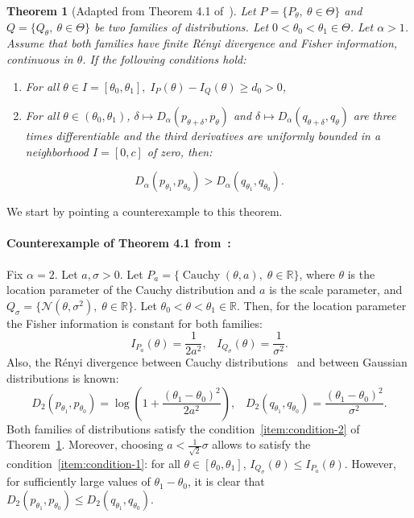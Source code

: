 \documentclass{article}
\theoremstyle{plain}
\newtheorem{theorem}{Theorem}[section]
\theoremstyle{definition}
\theoremstyle{remark}
\DeclareMathOperator{\Cauchy}{Cauchy}
\begin{document}
\begin{theorem}[Adapted from Theorem 4.1 of~\citet{Abbasnejad2006}]
\label{thm:renyi-fisher-comparison-wrong}
Let $P = \{P_\theta,\ \theta\in \Theta\}$ and $Q = \{Q_\theta,\ \theta\in \Theta\}$ be two families of distributions. Let $0 < \theta_0 < \theta_1 \in \Theta$. Let $\alpha > 1$. Assume that both families have finite Rényi divergence and Fisher information, continuous in $\theta$. If the following conditions hold:
\begin{enumerate}
    \item \label{item:condition-1} For all $\theta \in I=[\theta_0,\theta_1], \;I_P(\theta) - I_Q(\theta) \geq d_0 > 0$,
    \item \label{item:condition-2} For all $\theta \in (\theta_0,\theta_1)$, $\delta \mapsto D_\alpha(p_{\theta + \delta},p_\theta)$ and $\delta \mapsto D_\alpha(q_{\theta + \delta},q_\theta)$ are three times differentiable and the third derivatives are uniformly bounded in a neighborhood $I = [0,c]$ of zero, then:
\end{enumerate}
\[ D_\alpha(p_{\theta_1},p_{\theta_0}) >D_\alpha(q_{\theta_1},q_{\theta_0}).\]
\end{theorem}
We start by pointing a counterexample to this theorem.

\paragraph{Counterexample of Theorem 4.1 from~\citet{Abbasnejad2006}:}
Fix $\alpha = 2$. Let $a, \sigma > 0$. Let $P_a = \{ \Cauchy(\theta, a),\; \theta \in \mathbb{R}\}$, where $\theta$ is the location parameter of the Cauchy distribution and $a$ is the scale parameter, and $Q_\sigma = \{ \mathcal{N}(\theta, \sigma^2),\; \theta \in \mathbb{R}\}$. Let $\theta_0 < \theta < \theta_1 \in \mathbb{R}$. Then, for the location parameter the Fisher information is constant for both families:
\[I_{P_a}(\theta) = \frac{1}{2 a^2},\;\;\; I_{Q_\sigma}(\theta) = \frac{1}{\sigma^2}.\]
 Also, the Rényi divergence between Cauchy distributions~\citep{Verdu2023} and between Gaussian distributions is known:
 \[D_2(p_{\theta_1}, p_{\theta_0}) = \log\left(1 + \frac{(\theta_1-\theta_0)^2}{2 a^2}\right),\;\;\; D_2(q_{\theta_1}, q_{\theta_0}) = \frac{(\theta_1-\theta_0)^2}{\sigma^2}.\]
 Both families of distributions satisfy the condition~\ref{item:condition-2} of Theorem~\ref{thm:renyi-fisher-comparison-wrong}. Moreover, choosing $a < \frac{1}{\sqrt{2}}\sigma$ allows to satisfy the condition~\ref{item:condition-1}: for all $\theta \in [\theta_0,\theta_1]$, $I_{Q_\sigma}(\theta) \leq I_{P_a}(\theta)$.
 However, for sufficiently large values of $\theta_1 - \theta_0$, it is clear that $D_2(p_{\theta_1}, p_{\theta_0}) \leq D_2(q_{\theta_1}, q_{\theta_0})$.
\end{document}

